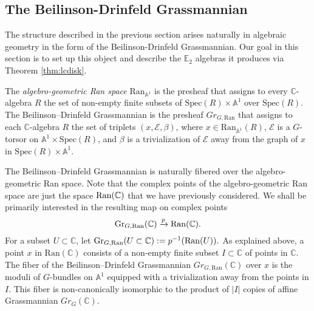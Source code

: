 \begin{comment}
\begin{rmk}
In fact, this theorem will be logically unnecessary for what follows and we include it only for completeness.  As such, we omit the definition of the term \emph{constructible cosheaf}.  
\end{rmk}

We summarize the preceding discussion by drawing the following corollary of Theorem~\ref{thm:lcdisk}:
\begin{cor} \label{cor:E2crit}
Let $\C$ be a symmetric monoidal $\infty$-category and $A \in \C$ be a $\mathrm{Fact}(\mathbb{C})$ algebra.  Suppose that $A$ has the property that for any inclusion $D\subset D' \subset \mathbb{C}$ of disks, the natural map $A(\mathrm{Ran}(D))\to A(\mathrm{Ran}(D'))$ is an equivalence.  Then, for any disk $D\subset \mathbb{C}$, $A(\mathrm{Ran}(D))$ inherits the structure of a non-unital $\mathbb{E}_2$-algebra in $\C$.  
\end{cor}
\end{comment}


\subsection{The Beilinson-Drinfeld Grassmannian}
The structure described in the previous section arises naturally in algebraic geometry in the form of the Beilinson-Drinfeld Grassmannian.  Our goal in this section is to set up this object and describe the $\mathbb{E}_2$ algebras it produces via Theorem \ref{thm:lcdisk}.

\begin{dfn}
The \textit{algebro-geometric Ran space} $\text{Ran}_{\mathbb{A}^1}$ is the presheaf that assigns to every $\mathbb{C}$-algebra $R$ the set of non-empty finite subsets of $\text{Spec}(R) \times \mathbb{A}^1$ over $\text{Spec}(R)$.   The Beilinson--Drinfeld Grassmannian is the presheaf $Gr_{G,\text{Ran}}$ that assigns to each $\mathbb{C}$-algebra $R$ the set of triplets $(x,\mathcal{E},\beta)$, where $x \in \text{Ran}_{\mathbb{A}^1}(R)$, $\mathcal{E}$ is a $G$-torsor on $\mathbb{A}^1 \times \text{Spec}(R)$, and $\beta$ is a trivialization of $\mathcal{E}$ away from the graph of $x$ in $\text{Spec}(R) \times \mathbb{A}^1$. 
\end{dfn}

The Beilinson--Drinfeld Grassmannian is naturally fibered over the algebro-geometric Ran space.  Note that the complex points of the algebro-geometric Ran space are just the space $\operatorname{\mathrm{Ran}} (\mathbb{C})$ that we have previously considered.  We shall be primarily interested in the resulting map on complex points $$\operatorname{\mathrm{Gr}}_{G,\operatorname{\mathrm{Ran}}}(\mathbb{C}) \xrightarrow{p} \operatorname{\mathrm{Ran}}(\mathbb{C}).$$ For a subset $U\subset \mathbb{C}$, let $\operatorname{\mathrm{Gr}}_{G,\operatorname{\mathrm{Ran}}}(U\subset \mathbb{C}):= p^{-1}(\operatorname{\mathrm{Ran}}(U)).$   As explained above, a point $x$ in $\text{Ran}(\mathbb{C})$ consists of a non-empty finite subset $I \subset \mathbb{C}$ of points in $\mathbb{C}$.  The fiber of the Beilinson--Drinfeld Grassmannian $Gr_{G,\text{Ran}}(\mathbb{C})$ over $x$ is the moduli of $G$-bundles on $\mathbb{A}^1$ equipped with a trivialization away from the points in $I$.  This fiber is non-canonically isomorphic to the product of $|I|$ copies of affine Grassmannian $Gr_G(\mathbb{C})$.  

